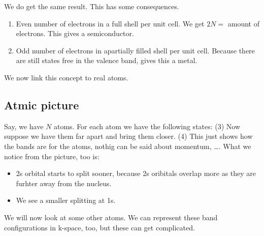 We do get the same result. This has some consequences.
\begin{enumerate}
	\item Even number of electrons in a full shell per unit cell. We get $2N =$ amount of electrons. This gives a semiconductor.
	\item Odd number of electrons in apartially filled shell per unit cell. Because there are still states free in the valence band, gives this a metal.
\end{enumerate}
We now link this concept to real atoms.
\subsection{Atmic picture}
Say, we have $N$ atoms.
For each atom we have the following states: (3)
Now suppose we have them far apart and bring them closer. (4)
This just shows how the bands are for the atoms, nothig can be said about momentum, \dots. What we notice from the picture, too is:
\begin{itemize}
	\item 2s orbital starts to split sooner, because 2s oribitals overlap more as they are furhter away from the nucleus.
	\item We see a smaller splitting at 1s.
\end{itemize}

We will now look at some other atoms.
We can represent these band configurations in k-space, too, but these can get complicated.